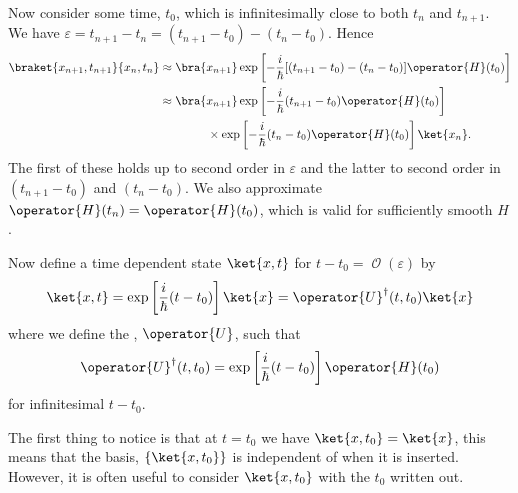 \documentclass[fleqn]{NotesClass}
\newcommand*{\hermit}{\dagger}
\newcommand*{\order}{\mathop{\mathcal{O}}}
\newcommand*{\hamiltonian}{H}
\begin{document}
    Now consider some time, \(t_0\), which is infinitesimally close to both \(t_n\) and \(t_{n+1}\).
    We have \(\varepsilon = t_{n+1} - t_n = (t_{n+1} - t_0) - (t_n - t_0)\).
    Hence
    \begin{align}
        \braket{x_{n+1}, t_{n+1}}{x_n, t_n} &\approx \bra{x_{n+1}} \exp\left[ -\frac{i}{\hbar}[(t_{n+1} - t_0) - (t_n - t_0)]\operator{\hamiltonian}(t_0) \right]\\
        &\approx \bra{x_{n+1}} \exp\left[ -\frac{i}{\hbar}(t_{n+1} - t_0)\operator{\hamiltonian}(t_0) \right]\notag\\
        &\qquad\qquad\times\exp\left[ -\frac{i}{\hbar}(t_n - t_0)\operator{\hamiltonian}(t_0) \right] \ket{x_n}.
    \end{align}
    The first of these holds up to second order in \(\varepsilon\) and the latter to second order in \((t_{n+1} - t_0)\) and \((t_n - t_0)\).
    We also approximate \(\operator{\hamiltonian}(t_n) = \operator{\hamiltonian}(t_0)\), which is valid for sufficiently smooth \(H\).
    
    Now define a time dependent state \(\ket{x, t}\) for \(t - t_0 = \order(\varepsilon)\) by
    \begin{equation}
        \ket{x, t} = \exp\left[ \frac{i}{\hbar}(t - t_0) \right]\ket{x} = \operator{U}^\hermit(t, t_0)\ket{x}
    \end{equation}
    where we define the , \(\operator{U}\), such that
    \begin{equation}
        \operator{U}^\hermit(t, t_0) = \exp\left[ \frac{i}{\hbar}(t - t_0) \right]\operator{\hamiltonian}(t_0)
    \end{equation}
    for infinitesimal \(t - t_0\).
    
    The first thing to notice is that at \(t = t_0\) we have \(\ket{x, t_0} = \ket{x}\), this means that the basis, \(\{\ket{x, t_0}\}\) is independent of when it is inserted.
    However, it is often useful to consider \(\ket{x, t_0}\) with the \(t_0\) written out.
    
\end{document}
